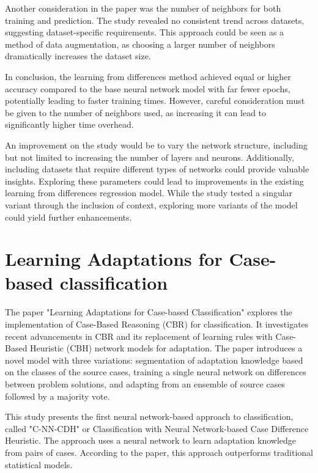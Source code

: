 \documentclass[a4paper, 12pt]{report}
\begin{document}
Another consideration in the paper \cite{learningFromDifferences2022} was the number of neighbors for both training and prediction.
The study revealed no consistent trend across datasets, suggesting dataset-specific requirements.
This approach could be seen as a method of data augmentation, as choosing a larger number of neighbors dramatically increases the dataset size.

In conclusion, the learning from differences method achieved equal or higher accuracy compared to the base neural network model with far fewer epochs,
potentially leading to faster training times. However, careful consideration must be given to the number of neighbors used, as increasing it can lead to significantly higher time overhead.

An improvement on the study \cite{learningFromDifferences2022} would be to vary the network structure, including but not limited to increasing the number of layers and neurons.
Additionally, including datasets that require different types of networks could provide valuable insights.
Exploring these parameters could lead to improvements in the existing learning from differences regression model.
While the study tested a singular variant through the inclusion of context, exploring more variants of the model could yield further enhancements.
\section{Learning Adaptations for Case-based classification}
The paper \cite{ye2021learning} "Learning Adaptations for Case-based Classification" explores the implementation of Case-Based Reasoning (CBR) for classification.
It investigates recent advancements in CBR and its replacement of learning rules with Case-Based Heuristic (CBH) network models for adaptation.
The paper introduces a novel model with three variations: segmentation of adaptation knowledge based on the classes of the source cases,
training a single neural network on differences between problem solutions, and adapting from an ensemble of source cases followed by a majority vote.

This study \cite{ye2021learning} presents the first neural network-based approach to classification, called "C-NN-CDH" or
Classification with Neural Network-based Case Difference Heuristic. The approach uses a neural network to learn adaptation knowledge from pairs of cases.
According to the paper, this approach outperforms traditional statistical models.
\end{document}
